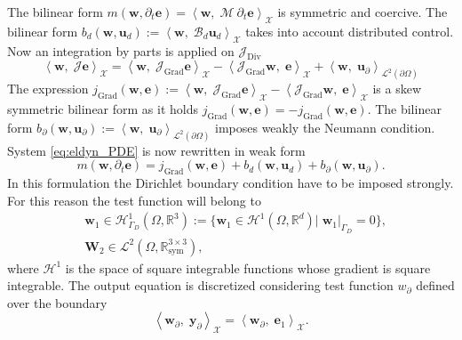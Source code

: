 \documentclass{svjour3}                     %
\DeclareMathOperator*{\Grad}{Grad}
\DeclareMathOperator*{\Div}{Div}
\begin{document}
The bilinear form $m(\bm{w}, \partial_t \bm{e}) = \left\langle \bm{w}, \; \bm{\mathcal{M}} \ \partial_t \bm{e} \right\rangle_{\mathscr{X}}$ is symmetric and coercive. The bilinear form $b_d(\bm{w}, \bm{u}_d):=\left\langle \bm{w}, \; \bm{\mathcal{B}}_d \bm{u}_d \right\rangle_{\mathscr{X}}$ takes into account distributed control.\\
Now an integration by parts is applied on $\bm{\mathcal{J}}_{\Div}$
\begin{equation}
\left\langle \bm{w}, \; \bm{\mathcal{J}} \bm{e} \right\rangle_{\mathscr{X}} = \left\langle \bm{w}, \; \bm{\mathcal{J}}_{\Grad} \bm{e} \right\rangle_{\mathscr{X}} - \left\langle \bm{\mathcal{J}}_{\Grad} \bm{w}, \; \bm{e} \right\rangle_{\mathscr{X}} + \left\langle \bm{w}, \; \bm{u}_\partial \right\rangle_{\mathscr{L}^2(\partial \Omega)}
\end{equation}
The expression $j_{\Grad}(\bm{w}, \bm{e}) :=\left\langle \bm{w}, \; \bm{\mathcal{J}}_{\Grad} \bm{e} \right\rangle_{\mathscr{X}} - \left\langle \bm{\mathcal{J}}_{\Grad} \bm{w}, \; \bm{e} \right\rangle_{\mathscr{X}}$ is a skew symmetric bilinear form as it holds $j_{\Grad}(\bm{w}, \bm{e})=-j_{\Grad}(\bm{w}, \bm{e})$. The bilinear form $b_{\partial}(\bm{w}, \bm{u}_\partial) := \left\langle \bm{w}, \; \bm{u}_\partial \right\rangle_{\mathscr{L}^2(\partial \Omega)}$ imposes weakly the Neumann condition. System \eqref{eq:eldyn_PDE} is now rewritten in weak form
\begin{equation}
m(\bm{w}, \partial_t \bm{e}) = j_{\Grad}(\bm{w}, \bm{e}) + b_d(\bm{w}, \bm{u}_d) + b_{\partial}(\bm{w}, \bm{u}_\partial).
\end{equation}
In this formulation the Dirichlet boundary condition have to be imposed strongly. For this reason the test function will belong to
\begin{align*}
	&\bm{w}_1 \in \mathscr{H}^1_{\Gamma_D}(\Omega, \mathbb{R}^3) := \{\bm{w}_1 \in \mathscr{H}^1(\Omega, \mathbb{R}^d)|\;  \bm{w}_1|_{\Gamma_D} = 0  \}, \\
	&\bm{W}_2 \in \mathscr{L}^2(\Omega, \mathbb{R}^{3\times 3}_{\text{sym}}),
\end{align*} 
where $\mathscr{H}^1$ is the space of square integrable functions whose gradient is square integrable. The output equation is discretized considering test function $w_\partial$ defined over the boundary
\begin{equation}
\left\langle \bm{w}_\partial, \; \bm{y}_\partial \right\rangle_{\mathscr{X}} = \left\langle \bm{w}_\partial, \; \bm{e}_1 \right\rangle_{\mathscr{X}}.
\end{equation}
\end{document}
